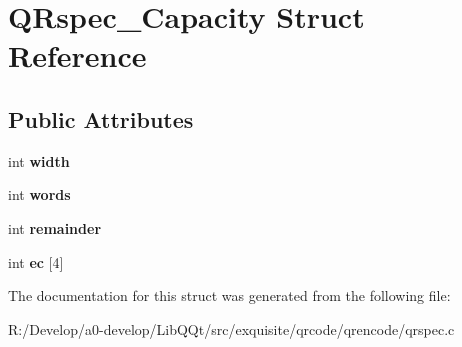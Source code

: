 \hypertarget{struct_q_rspec___capacity}{}\section{Q\+Rspec\+\_\+\+Capacity Struct Reference}
\label{struct_q_rspec___capacity}
\subsection*{Public Attributes}
\begin{DoxyCompactItemize}
\item 
\mbox{\label{struct_q_rspec___capacity_af8a2a90900cef176ab483f664f2f7824}} 
int {\bfseries width}
\item 
\mbox{\label{struct_q_rspec___capacity_a6dd21331c64ef65310427ca28bf29777}} 
int {\bfseries words}
\item 
\mbox{\label{struct_q_rspec___capacity_af7d1ce2bdce5518b2a3e3f67cdba68c7}} 
int {\bfseries remainder}
\item 
\mbox{\label{struct_q_rspec___capacity_a379849c2096a48444813b7878ada4624}} 
int {\bfseries ec} \mbox{[}4\mbox{]}
\end{DoxyCompactItemize}


The documentation for this struct was generated from the following file\+:\begin{DoxyCompactItemize}
\item 
R\+:/\+Develop/a0-\/develop/\+Lib\+Q\+Qt/src/exquisite/qrcode/qrencode/qrspec.\+c\end{DoxyCompactItemize}
